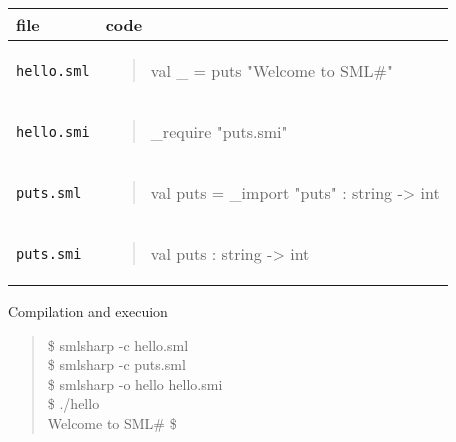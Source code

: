 \documentclass{jbook}
\newcommand{\code}[1]{\mbox{\large\tt #1}}
\newenvironment{program}{\begin{quote}\begin{tt}}%
                        {\end{tt}\end{quote}}
\begin{document}
\begin{itemize}
\begin{tabular}{|l|l|}
\hline
file & code
\\\hline
\hline
\begin{minipage}{0.5\textwidth}
\code{hello.sml}
\end{minipage}
&
\begin{minipage}{0.5\textwidth}
\begin{program}
val \_ = puts "Welcome to SML\#"
\end{program}
\end{minipage}
\\\hline
\begin{minipage}{0.5\textwidth}
\code{hello.smi}
\end{minipage}
&
\begin{minipage}{0.5\textwidth}
\begin{program}
\_require "puts.smi"
\end{program}
\end{minipage}
\\\hline
\begin{minipage}{0.5\textwidth}
\code{puts.sml}
\end{minipage}
&
\begin{minipage}{0.5\textwidth}
\begin{program}
val puts = \_import "puts" : string -> int
\end{program}
\end{minipage}
\\\hline
\begin{minipage}{0.5\textwidth}
\code{puts.smi}
\end{minipage}
&
\begin{minipage}{0.5\textwidth}
\begin{program}
val puts : string -> int
\end{program}
\end{minipage}
\\\hline
\end{tabular}


Compilation and execuion
\begin{program}
 \$ smlsharp -c hello.sml\\
 \$ smlsharp -c puts.sml\\
 \$ smlsharp -o hello hello.smi\\
 \$ ./hello\\
  Welcome to SML\#
 \$
\end{program}
\end{itemize}

\fi%
\end{document}

